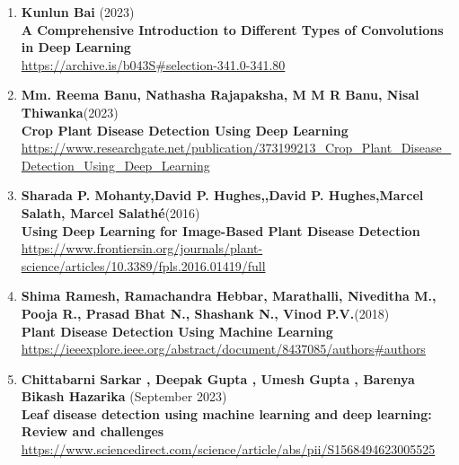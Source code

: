 \begin{enumerate}
    \item \textbf{Kunlun Bai} (2023)\\
        \textbf{A Comprehensive Introduction to Different Types of Convolutions in Deep Learning} \\
        \href{https://archive.is/b043S#selection-341.0-341.80}{https://archive.is/b043S\#selection-341.0-341.80} \\

    \item \textbf{Mm. Reema Banu, Nathasha Rajapaksha, M M R Banu, Nisal Thiwanka}(2023) \\
        \textbf{Crop Plant Disease Detection Using Deep Learning} \\
        \href{https://www.researchgate.net/publication/373199213_Crop_Plant_Disease_Detection_Using_Deep_Learning}{https://www.researchgate.net/publication/373199213\_Crop\_Plant\_Disease\_Detection\_Using\_Deep\_Learning} 

    \item \textbf{Sharada P. Mohanty,David P. Hughes,,David P. Hughes,Marcel Salath, Marcel Salathé}(2016) \\
        \textbf{Using Deep Learning for Image-Based Plant Disease Detection} \\
        \href{https://www.frontiersin.org/journals/plant-science/articles/10.3389/fpls.2016.01419/full}{https://www.frontiersin.org/journals/plant-science/articles/10.3389/fpls.2016.01419/full}

    \item \textbf{Shima Ramesh, Ramachandra Hebbar, Marathalli, Niveditha M., Pooja R., Prasad Bhat N., Shashank N., Vinod P.V.}(2018) \\
        \textbf{Plant Disease Detection Using Machine Learning} \\
        \href{https://ieeexplore.ieee.org/abstract/document/8437085/authors#authors}{https://ieeexplore.ieee.org/abstract/document/8437085/authors\#authors}

    \item \textbf{Chittabarni Sarkar , Deepak Gupta , Umesh Gupta , Barenya Bikash Hazarika } (September 2023) \\
    \textbf{Leaf disease detection using machine learning and deep learning: Review and challenges} \\
  \href{https://www.sciencedirect.com/science/article/abs/pii/S1568494623005525}{https://www.sciencedirect.com/science/article/abs/pii/S1568494623005525}


\end{enumerate}

